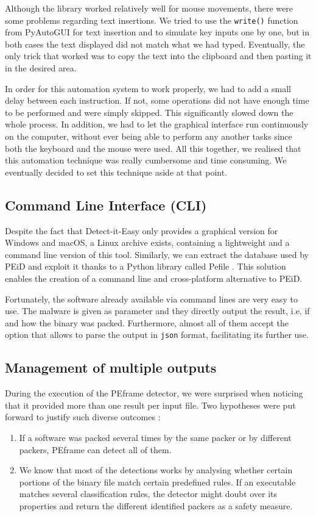 Although the library worked relatively well for mouse movements, there were some problems regarding text insertions. We tried to use the \texttt{write()} function from PyAutoGUI for text insertion and to simulate key inputs one by one, but in both cases the text displayed did not match what we had typed. Eventually, the only trick that worked was to copy the text into the clipboard and then pasting it in the desired area.

In order for this automation system to work properly, we had to add a small delay between each instruction. If not, some operations did not have enough time to be performed and were simply skipped. This significantly slowed down the whole process. In addition, we had to let the graphical interface run continuously on the computer, without ever being able to perform any another tasks since both the keyboard and the mouse were used. All this together, we realised that this automation technique was really cumbersome and time consuming. We eventually decided to set this technique aside at that point.

\subsection{Command Line Interface (CLI)}

Despite the fact that Detect-it-Easy only provides a graphical version for Windows and macOS, a Linux archive exists, containing a lightweight and a command line version of this tool. Similarly, we can extract the database used by PEiD and exploit it thanks to a Python library called Pefile \cite{pefile}. This solution enables the creation of a command line and cross-platform alternative to PEiD.

Fortunately, the software already available via command lines are very easy to use. The malware is given as parameter and they directly output the result, i.e. if and how the binary was packed. Furthermore, almost all of them accept the option that allows to parse the output in \texttt{json} format, facilitating its further use.

\subsection{Management of multiple outputs}
During the execution of the PEframe detector, we were surprised when noticing that it provided more than one result per input file. Two hypotheses were put forward to justify such diverse outcomes :
\begin{enumerate}
    \item If a software was packed several times by the same packer or by different packers, PEframe can detect all of them.
    \item We know that most of the detections works by analysing whether certain portions of the binary file match certain predefined rules. If an executable matches several classification rules, the detector might doubt over its properties and return the different identified packers as a safety measure.
\end{enumerate}

